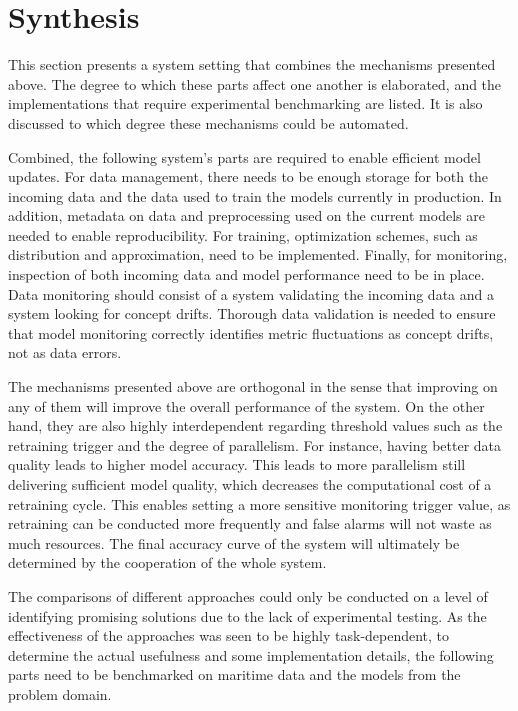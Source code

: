 \section{Synthesis}

This section presents a system setting that combines the mechanisms presented above. The degree to which these parts affect one another is elaborated, and the implementations that require experimental benchmarking are listed. It is also discussed to which degree these mechanisms could be automated.


\enlargethispage{14mm}
Combined, the following system's parts are required to enable efficient model updates. For data management, there needs to be enough storage for both the incoming data and the data used to train the models currently in production. In addition, metadata on data and preprocessing used on the current models are needed to enable reproducibility. For training, optimization schemes, such as distribution and approximation, need to be implemented. Finally, for monitoring, inspection of both incoming data and model performance need to be in place. Data monitoring should consist of a system validating the incoming data and a system looking for concept drifts. Thorough data validation is needed to ensure that model monitoring correctly identifies metric fluctuations as concept drifts, not as data errors.

The mechanisms presented above are orthogonal in the sense that improving on any of them will improve the overall performance of the system. On the other hand, they are also highly interdependent regarding threshold values such as the retraining trigger and the degree of parallelism. For instance, having better data quality leads to higher model accuracy. This leads to more parallelism still delivering sufficient model quality, which decreases the computational cost of a retraining cycle. This enables setting a more sensitive monitoring trigger value, as retraining can be conducted more frequently and false alarms will not waste as much resources. The final accuracy curve of the system will ultimately be determined by the cooperation of the whole system.

The comparisons of different approaches could only be conducted on a level of identifying promising solutions due to the lack of experimental testing. As the effectiveness of the approaches was seen to be highly task-dependent, to determine the actual usefulness and some implementation details, the following parts need to be benchmarked on maritime data and the models from the problem domain.

